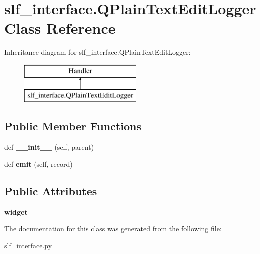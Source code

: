 \hypertarget{classslf__interface_1_1_q_plain_text_edit_logger}{}\section{slf\+\_\+interface.\+Q\+Plain\+Text\+Edit\+Logger Class Reference}
\label{classslf__interface_1_1_q_plain_text_edit_logger}
Inheritance diagram for slf\+\_\+interface.\+Q\+Plain\+Text\+Edit\+Logger\+:\begin{figure}[H]
\begin{center}
\leavevmode
\includegraphics[height=2.000000cm]{classslf__interface_1_1_q_plain_text_edit_logger}
\end{center}
\end{figure}
\subsection*{Public Member Functions}
\begin{DoxyCompactItemize}
\item 
def {\bfseries \+\_\+\+\_\+init\+\_\+\+\_\+} (self, parent)\hypertarget{classslf__interface_1_1_q_plain_text_edit_logger_ab08b1d61e4f1f0764d9c2f8434ee11bf}{}\label{classslf__interface_1_1_q_plain_text_edit_logger_ab08b1d61e4f1f0764d9c2f8434ee11bf}

\item 
def {\bfseries emit} (self, record)\hypertarget{classslf__interface_1_1_q_plain_text_edit_logger_adf5fc32363237dba76cf74bbb7f2a131}{}\label{classslf__interface_1_1_q_plain_text_edit_logger_adf5fc32363237dba76cf74bbb7f2a131}

\end{DoxyCompactItemize}
\subsection*{Public Attributes}
\begin{DoxyCompactItemize}
\item 
{\bfseries widget}\hypertarget{classslf__interface_1_1_q_plain_text_edit_logger_a47ae46178ea0dab95964e868a206dc24}{}\label{classslf__interface_1_1_q_plain_text_edit_logger_a47ae46178ea0dab95964e868a206dc24}

\end{DoxyCompactItemize}


The documentation for this class was generated from the following file\+:\begin{DoxyCompactItemize}
\item 
slf\+\_\+interface.\+py\end{DoxyCompactItemize}
